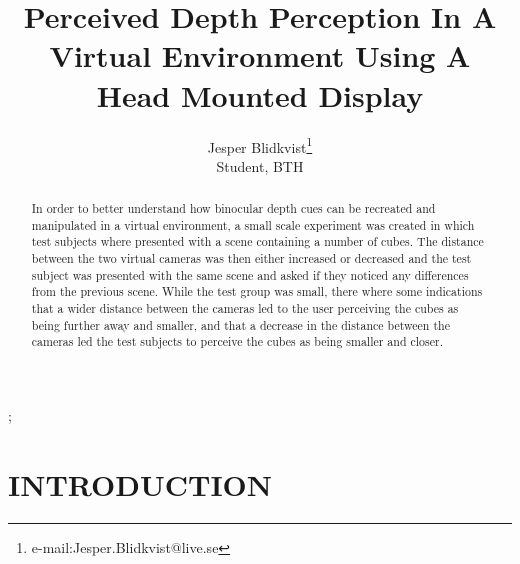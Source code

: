 \documentclass[tog]{acmsiggraph}
\title{Perceived Depth Perception In A Virtual Environment Using A Head Mounted Display}
\author{Jesper Blidkvist\thanks{e-mail:Jesper.Blidkvist@live.se}\\Student, BTH}
\begin{document}


\maketitle

\begin{abstract}
In order to better understand how binocular depth cues can be recreated and manipulated in a virtual environment, a small scale experiment was created in which test subjects where presented with a scene containing a number of cubes. The distance between the two virtual cameras was then either increased or decreased and the test subject was presented with the same scene and asked if they noticed any differences from the previous scene. While the test group was small, there where some indications that a wider distance between the cameras led to the user perceiving the cubes as being further away and smaller, and that a decrease in the distance between the cameras led the test subjects to perceive the cubes as being smaller and closer.



\end{abstract}

\begin{CRcatlist}
  ;
\end{CRcatlist}

\keywordlist


\copyrightspace

\section{INTRODUCTION}
\end{document}
